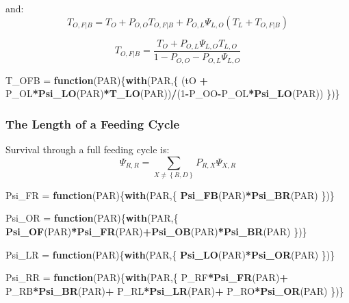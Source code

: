 \documentclass[]{article}
\newenvironment{Shaded}{\begin{snugshade}}{\end{snugshade}}
\newcommand{\ControlFlowTok}[1]{\textcolor[rgb]{0.13,0.29,0.53}{\textbf{#1}}}
\newcommand{\DecValTok}[1]{\textcolor[rgb]{0.00,0.00,0.81}{#1}}
\newcommand{\KeywordTok}[1]{\textcolor[rgb]{0.13,0.29,0.53}{\textbf{#1}}}
\newcommand{\NormalTok}[1]{#1}
\newcommand{\OperatorTok}[1]{\textcolor[rgb]{0.81,0.36,0.00}{\textbf{#1}}}
\newcommand{\StringTok}[1]{\textcolor[rgb]{0.31,0.60,0.02}{#1}}
\begin{document}
and: \[ 
T_{O,F|B} = T_O + P_{O,O} T_{O,F|B} + P_{O,L} \Psi_{L,O} \left(T_L + T_{O,F|B} \right)
\]

\[ 
T_{O,F|B}= \frac{T_O  + P_{O,L} \Psi_{L,O} T_{L,O}}{1 - P_{O,O} - P_{O,L} \Psi_{L,O}}
\]

\begin{Shaded}
\begin{Highlighting}[]
\NormalTok{T_OFB =}\StringTok{ }\ControlFlowTok{function}\NormalTok{(PAR)\{}\KeywordTok{with}\NormalTok{(PAR,\{}
\NormalTok{  (tO }\OperatorTok{+}\StringTok{ }\NormalTok{P_OL}\OperatorTok{*}\KeywordTok{Psi_LO}\NormalTok{(PAR)}\OperatorTok{*}\KeywordTok{T_LO}\NormalTok{(PAR))}\OperatorTok{/}\NormalTok{(}\DecValTok{1}\OperatorTok{-}\NormalTok{P_OO}\OperatorTok{-}\NormalTok{P_OL}\OperatorTok{*}\KeywordTok{Psi_LO}\NormalTok{(PAR))}
\NormalTok{\})\}}
\end{Highlighting}
\end{Shaded}

\hypertarget{the-length-of-a-feeding-cycle}{%
\subsubsection{The Length of a Feeding
Cycle}\label{the-length-of-a-feeding-cycle}}

Survival through a full feeding cycle is:
\[\Psi_{R,R} = \sum_{X \neq \left\{R,D\right\}} P_{R,X} \Psi_{X,R}\]

\begin{Shaded}
\begin{Highlighting}[]
\NormalTok{Psi_FR =}\StringTok{ }\ControlFlowTok{function}\NormalTok{(PAR)\{}\KeywordTok{with}\NormalTok{(PAR,\{}
  \KeywordTok{Psi_FB}\NormalTok{(PAR)}\OperatorTok{*}\KeywordTok{Psi_BR}\NormalTok{(PAR)}
\NormalTok{\})\} }

\NormalTok{Psi_OR =}\StringTok{ }\ControlFlowTok{function}\NormalTok{(PAR)\{}\KeywordTok{with}\NormalTok{(PAR,\{}
  \KeywordTok{Psi_OF}\NormalTok{(PAR)}\OperatorTok{*}\KeywordTok{Psi_FR}\NormalTok{(PAR)}\OperatorTok{+}\KeywordTok{Psi_OB}\NormalTok{(PAR)}\OperatorTok{*}\KeywordTok{Psi_BR}\NormalTok{(PAR)}
\NormalTok{\})\}}

\NormalTok{Psi_LR =}\StringTok{ }\ControlFlowTok{function}\NormalTok{(PAR)\{}\KeywordTok{with}\NormalTok{(PAR,\{}
  \KeywordTok{Psi_LO}\NormalTok{(PAR)}\OperatorTok{*}\KeywordTok{Psi_OR}\NormalTok{(PAR)}
\NormalTok{\})\}}

\NormalTok{Psi_RR =}\StringTok{ }\ControlFlowTok{function}\NormalTok{(PAR)\{}\KeywordTok{with}\NormalTok{(PAR,\{}
\NormalTok{  P_RF}\OperatorTok{*}\KeywordTok{Psi_FR}\NormalTok{(PAR)}\OperatorTok{+}
\StringTok{  }\NormalTok{P_RB}\OperatorTok{*}\KeywordTok{Psi_BR}\NormalTok{(PAR)}\OperatorTok{+}
\StringTok{  }\NormalTok{P_RL}\OperatorTok{*}\KeywordTok{Psi_LR}\NormalTok{(PAR)}\OperatorTok{+}
\StringTok{  }\NormalTok{P_RO}\OperatorTok{*}\KeywordTok{Psi_OR}\NormalTok{(PAR)}
\NormalTok{\})\}}
\end{Highlighting}
\end{Shaded}
\end{document}
